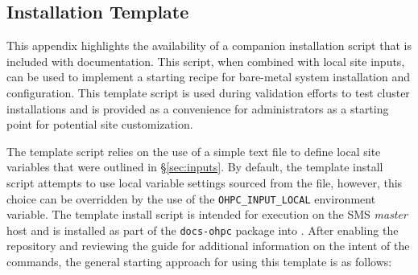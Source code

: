 \subsection{Installation Template}  \label{appendix:template_script}

This appendix highlights the availability of a companion installation script
that is included with \OHPC{} documentation.  This script, when combined with
local site inputs, can be used to implement a starting recipe for
bare-metal system installation and configuration. This template script is used
during validation efforts to test cluster installations and is provided as a
convenience for administrators as a starting point for potential site
customization. 

The template script relies on the use of a simple text file to
define local site variables that were outlined in \S\ref{sec:inputs}.
By default, the template install script attempts to use local variable settings
sourced from the  file,
however, this choice can be overridden by the use of the
\texttt{OHPC\_INPUT\_LOCAL} environment variable. The template install script is
intended for execution on the SMS {\em master} host and is installed as part of
the \texttt{docs-ohpc} package into .
After enabling the \OHPC{} repository and reviewing the guide for additional information on the intent of the
commands, the general starting approach for using this template is as follows:

